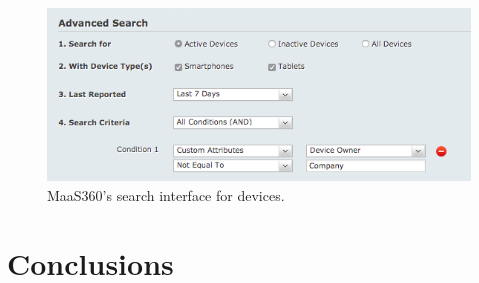 \documentclass{llncs}
\begin{document}
\begin{figure}\centering
  \includegraphics[width=\linewidth]{figures/maas-groupsearch.png}
  \caption{MaaS360's search interface for devices.}
  \label{fig:maas360search}
\end{figure}

\section{Conclusions}
\label{sec:conclusions}



{}

\end{document}
